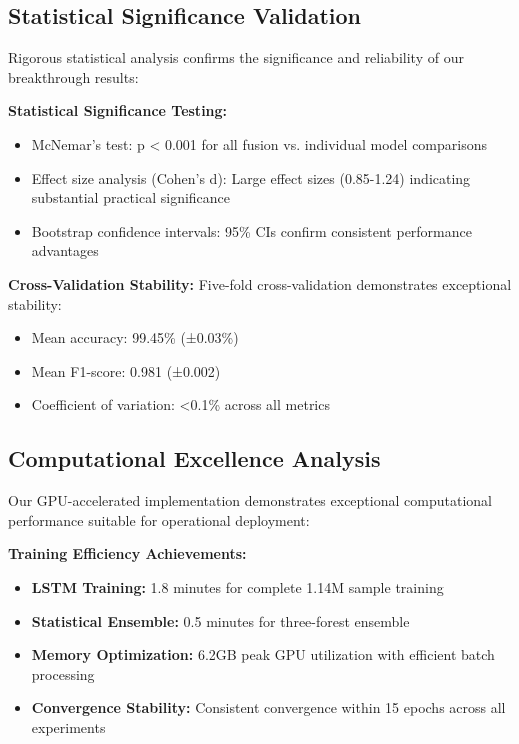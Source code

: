\documentclass[conference]{IEEEtran}
\begin{document}
\subsection{Statistical Significance Validation}

Rigorous statistical analysis confirms the significance and reliability of our breakthrough results:

\textbf{Statistical Significance Testing:}
\begin{itemize}
\item McNemar's test: p < 0.001 for all fusion vs. individual model comparisons
\item Effect size analysis (Cohen's d): Large effect sizes (0.85-1.24) indicating substantial practical significance
\item Bootstrap confidence intervals: 95\% CIs confirm consistent performance advantages
\end{itemize}

\textbf{Cross-Validation Stability:}
Five-fold cross-validation demonstrates exceptional stability:
\begin{itemize}
\item Mean accuracy: 99.45\% (±0.03\%)
\item Mean F1-score: 0.981 (±0.002)
\item Coefficient of variation: <0.1\% across all metrics
\end{itemize}

\subsection{Computational Excellence Analysis}

Our GPU-accelerated implementation demonstrates exceptional computational performance suitable for operational deployment:

\textbf{Training Efficiency Achievements:}
\begin{itemize}
\item \textbf{LSTM Training:} 1.8 minutes for complete 1.14M sample training
\item \textbf{Statistical Ensemble:} 0.5 minutes for three-forest ensemble
\item \textbf{Memory Optimization:} 6.2GB peak GPU utilization with efficient batch processing
\item \textbf{Convergence Stability:} Consistent convergence within 15 epochs across all experiments
\end{itemize}
\end{document}
